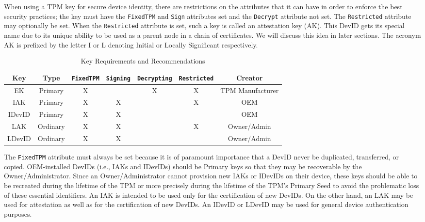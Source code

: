 When using a TPM key for secure device identity, there are restrictions on the attributes that it can have in order to enforce the best security practices; the key must have the \verb|FixedTPM| and \verb|Sign| attributes set and the \verb|Decrypt| attribute not set. The \verb|Restricted| attribute may optionally be set. When the \verb|Restricted| attribute is set, such a key is called an attestation key (AK). This DevID gets its special name due to its unique ability to be used as a parent node in a chain of certificates. We will discuss this idea in later sections. The acronym AK is prefixed by the letter I or L denoting Initial or Locally Significant respectively. 
\begin{table}[h]
  \begin{center}
    \scriptsize 
    \sffamily
    \renewcommand{\arraystretch}{1.5}
    \begin{tabular}{ |c|c|c|c|c|c|c| }
      \hline
      Key & Type & \verb|FixedTPM| & \verb|Signing| & \verb|Decrypting| & \verb|Restricted| & Creator \\
      \hline
      \hline
      EK & Primary       & X &   & X & X & TPM Manufacturer \\
      \hline
      IAK & Primary      & X & X &   & X & OEM \\
      \hline
      IDevID & Primary   & X & X &   &   & OEM \\
      \hline
      LAK & Ordinary     & X & X &   & X & Owner/Admin \\
      \hline
      LDevID & Ordinary  & X & X &   &   & Owner/Admin \\
      \hline
    \end{tabular}
    \caption{Key Requirements and Recommendations}
    \label{fig:req_and_recs}
  \end{center}
\end{table}
The \verb|FixedTPM| attribute must always be set because it is of paramount importance that a DevID never be duplicated, transferred, or copied. OEM-installed DevIDs (i.e., IAKs and IDevIDs) should be Primary keys so that they may be recoverable by the Owner/Administrator. Since an Owner/Administrator cannot provision new IAKs or IDevIDs on their device, these keys should be able to be recreated during the lifetime of the TPM or more precisely during the lifetime of the TPM’s Primary Seed to avoid the problematic loss of these essential identifiers. An IAK is intended to be used only for the certification of new DevIDs. On the other hand, an LAK may be used for attestation as well as for the certification of new DevIDs. An IDevID or LDevID may be used for general device authentication purposes. 


